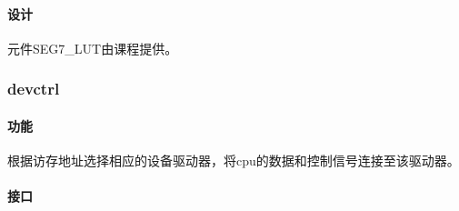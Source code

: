 \documentclass{article}
\begin{document}
\begin{spacing}{1.4}
\paragraph{设计}\mbox{}

元件SEG7\_LUT由课程提供。

\subsubsection{devctrl}

\paragraph{功能}\mbox{}

根据访存地址选择相应的设备驱动器，将cpu的数据和控制信号连接至该驱动器。

\paragraph{接口}\mbox{}


\end{spacing}
\end{document}

